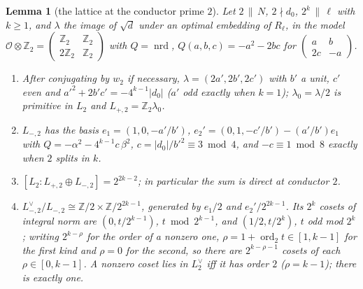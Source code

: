 \documentclass[11pt,reqno]{amsart}
\theoremstyle{plain}
\newtheorem{lemma}[theorem]{Lemma}
\theoremstyle{definition}
\DeclareMathOperator{\ord}{ord}
\DeclareMathOperator{\nrd}{nrd}
\newcommand{\Z}{\mathbb{Z}}
\begin{document}
\begin{lemma}[the lattice at the conductor prime $2$]\label{lem:conductor2}
Let $2\,\|\,N$, $2\nmid d_0$, $2^k\,\|\,\ell$ with $k\ge1$, and $\lambda$ the image of $\sqrt d$ under an
optimal embedding of $R_\ell$, in the model $\mathcal O\otimes\Z_2=\begin{pmatrix}\Z_2&\Z_2\\2\Z_2&\Z_2
\end{pmatrix}$ with $Q=\nrd$, $Q(a,b,c)=-a^2-2bc$ for $\begin{pmatrix}a&b\\2c&-a\end{pmatrix}$.
\begin{enumerate}
\item After conjugating by $w_2$ if necessary, $\lambda=(2a',2b',2c')$ with $b'$ a unit, $c'$ even
      and $a'^2+2b'c'=-4^{k-1}\lvert d_0\rvert$ ($a'$ odd exactly when $k=1$); $\lambda_0=\lambda/2$
      is primitive in $L_2$ and $L_{+,2}=\Z_2\lambda_0$.
\item $L_{-,2}$ has the basis $e_1=(1,0,-a'/b')$, $e_2'=(0,1,-c'/b')-(a'/b')e_1$ with
      $Q=-\alpha^2-4^{k-1}c\,\beta^2$, $c=\lvert d_0\rvert/b'^2\equiv3\bmod4$, and $-c\equiv1\bmod8$
      exactly when $2$ splits in $k$.
\item $[L_2:L_{+,2}\oplus L_{-,2}]=2^{2k-2}$; in particular the sum is direct at conductor $2$.
\item $L_{-,2}^\vee/L_{-,2}\cong\Z/2\times\Z/2^{2k-1}$, generated by $e_1/2$ and $e_2'/2^{2k-1}$. Its
      $2^k$ cosets of integral norm are $(0,t/2^{k-1})$, $t\bmod2^{k-1}$, and $(1/2,t/2^k)$, $t$ odd
      mod $2^k$; writing $2^{k-\rho}$ for the order of a nonzero one, $\rho=1+\ord_2t\in[1,k-1]$ for
      the first kind and $\rho=0$ for the second, so there are $2^{k-\rho-1}$ cosets of each
      $\rho\in[0,k-1]$. A nonzero coset lies in $L_2^\vee$ iff it has order $2$ ($\rho=k-1$); there is
      exactly one.
\end{enumerate}
\end{lemma}
\end{document}
